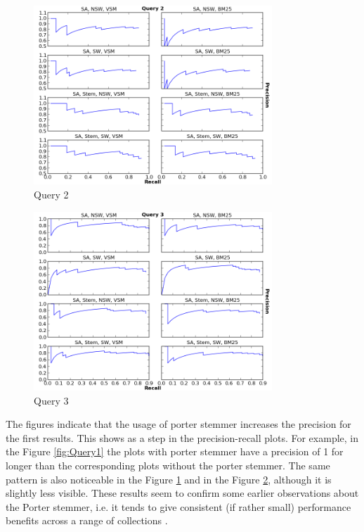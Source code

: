 \begin{figure}[ht]
  \centering
  \includegraphics[width=0.8\textwidth]{Query2.png}
  \caption{Query 2 }
  \label{fig:Query2}
\end{figure}
\FloatBarrier

\begin{figure}[ht]
  \centering
  \includegraphics[width=0.8\textwidth]{Query3.png}
  \caption{Query 3 }
  \label{fig:Query3}
\end{figure}
\FloatBarrier


The figures indicate that the usage of porter stemmer increases the precision for the first results. This shows as a step in the precision-recall plots. For example, in the Figure \ref{fig:Query1} the plots with porter stemmer have a precision of 1 for longer than the corresponding plots without the porter stemmer. The same pattern is also noticeable in the Figure \ref{fig:Query2} and in the Figure \ref{fig:Query3}, although it is slightly less visible. These results seem to confirm some earlier observations about the Porter stemmer, i.e. it tends to give consistent (if rather small) performance benefits across a range of collections \citep{croft1994corpus}. 

